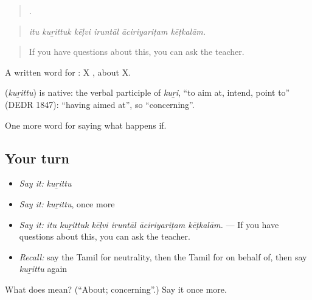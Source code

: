 \begin{quote}
     .
\end{quote}

\begin{quote}
\emph{itu kuṟittuk kēḷvi iruntāl āciriyariṭam kēṭkalām.}
\end{quote}

\begin{quote}
If you have questions about this, you can ask the teacher.
\end{quote}

A written word for : X , about X.

\begin{cousinweb}
\textbf{} (\emph{kuṟittu}) is native: the verbal participle of \emph{kuṟi}, \textquotedblleft{}to aim at, intend, point to\textquotedblright{} (DEDR 1847): \textquotedblleft{}having aimed at\textquotedblright{}, so \textquotedblleft{}concerning\textquotedblright{}.
\end{cousinweb}

\begin{grammarlens}[title={What you've built}]
One more word for saying what happens if.
\end{grammarlens}

\subsection*{Your turn}
\begin{itemize}
\raggedright
  \item \emph{Say it:} \emph{kuṟittu}
  \item \emph{Say it:} \emph{kuṟittu}, once more
  \item \emph{Say it:} \emph{itu kuṟittuk kēḷvi iruntāl āciriyariṭam kēṭkalām.} — If you have questions about this, you can ask the teacher.
  \item \emph{Recall:} say the Tamil for neutrality, then the Tamil for on behalf of, then say \emph{kuṟittu} again
\end{itemize}

\begin{tcolorbox}[breakable,colback=teal!4,colframe=teal!35!black,title={Before you move on}]
What does  mean? (\textquotedblleft{}About; concerning\textquotedblright{}.) Say it once more.
\end{tcolorbox}
